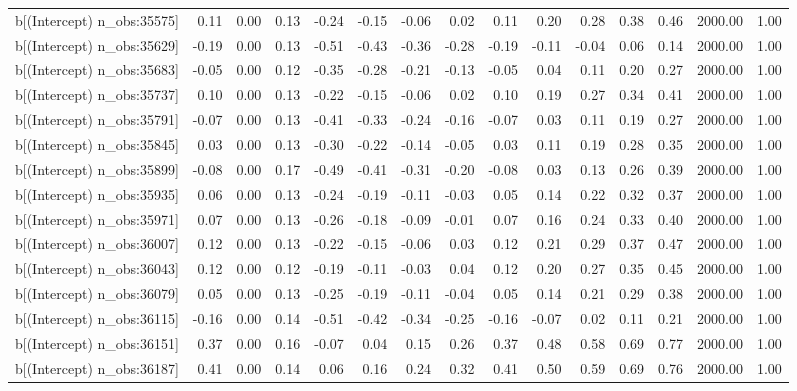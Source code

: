 \begin{table}[ht]
\begin{tabular}{rrrrrrrrrrrrrrr}
  b[(Intercept) n\_obs:35575] & 0.11 & 0.00 & 0.13 & -0.24 & -0.15 & -0.06 & 0.02 & 0.11 & 0.20 & 0.28 & 0.38 & 0.46 & 2000.00 & 1.00 \\ 
  b[(Intercept) n\_obs:35629] & -0.19 & 0.00 & 0.13 & -0.51 & -0.43 & -0.36 & -0.28 & -0.19 & -0.11 & -0.04 & 0.06 & 0.14 & 2000.00 & 1.00 \\ 
  b[(Intercept) n\_obs:35683] & -0.05 & 0.00 & 0.12 & -0.35 & -0.28 & -0.21 & -0.13 & -0.05 & 0.04 & 0.11 & 0.20 & 0.27 & 2000.00 & 1.00 \\ 
  b[(Intercept) n\_obs:35737] & 0.10 & 0.00 & 0.13 & -0.22 & -0.15 & -0.06 & 0.02 & 0.10 & 0.19 & 0.27 & 0.34 & 0.41 & 2000.00 & 1.00 \\ 
  b[(Intercept) n\_obs:35791] & -0.07 & 0.00 & 0.13 & -0.41 & -0.33 & -0.24 & -0.16 & -0.07 & 0.03 & 0.11 & 0.19 & 0.27 & 2000.00 & 1.00 \\ 
  b[(Intercept) n\_obs:35845] & 0.03 & 0.00 & 0.13 & -0.30 & -0.22 & -0.14 & -0.05 & 0.03 & 0.11 & 0.19 & 0.28 & 0.35 & 2000.00 & 1.00 \\ 
  b[(Intercept) n\_obs:35899] & -0.08 & 0.00 & 0.17 & -0.49 & -0.41 & -0.31 & -0.20 & -0.08 & 0.03 & 0.13 & 0.26 & 0.39 & 2000.00 & 1.00 \\ 
  b[(Intercept) n\_obs:35935] & 0.06 & 0.00 & 0.13 & -0.24 & -0.19 & -0.11 & -0.03 & 0.05 & 0.14 & 0.22 & 0.32 & 0.37 & 2000.00 & 1.00 \\ 
  b[(Intercept) n\_obs:35971] & 0.07 & 0.00 & 0.13 & -0.26 & -0.18 & -0.09 & -0.01 & 0.07 & 0.16 & 0.24 & 0.33 & 0.40 & 2000.00 & 1.00 \\ 
  b[(Intercept) n\_obs:36007] & 0.12 & 0.00 & 0.13 & -0.22 & -0.15 & -0.06 & 0.03 & 0.12 & 0.21 & 0.29 & 0.37 & 0.47 & 2000.00 & 1.00 \\ 
  b[(Intercept) n\_obs:36043] & 0.12 & 0.00 & 0.12 & -0.19 & -0.11 & -0.03 & 0.04 & 0.12 & 0.20 & 0.27 & 0.35 & 0.45 & 2000.00 & 1.00 \\ 
  b[(Intercept) n\_obs:36079] & 0.05 & 0.00 & 0.13 & -0.25 & -0.19 & -0.11 & -0.04 & 0.05 & 0.14 & 0.21 & 0.29 & 0.38 & 2000.00 & 1.00 \\ 
  b[(Intercept) n\_obs:36115] & -0.16 & 0.00 & 0.14 & -0.51 & -0.42 & -0.34 & -0.25 & -0.16 & -0.07 & 0.02 & 0.11 & 0.21 & 2000.00 & 1.00 \\ 
  b[(Intercept) n\_obs:36151] & 0.37 & 0.00 & 0.16 & -0.07 & 0.04 & 0.15 & 0.26 & 0.37 & 0.48 & 0.58 & 0.69 & 0.77 & 2000.00 & 1.00 \\ 
  b[(Intercept) n\_obs:36187] & 0.41 & 0.00 & 0.14 & 0.06 & 0.16 & 0.24 & 0.32 & 0.41 & 0.50 & 0.59 & 0.69 & 0.76 & 2000.00 & 1.00 \\ 

\end{tabular}
\end{table}
